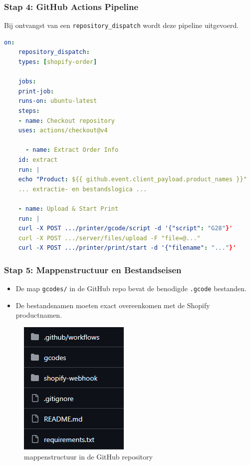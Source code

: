 \begin{enumerate}
\subsubsection{Stap 4: GitHub Actions Pipeline}

Bij ontvangst van een \texttt{repository\_dispatch} wordt deze pipeline uitgevoerd.

\begin{lstlisting}[language=yaml, caption=Shopify Order Print Pipeline (gedeeltelijk)]
    on:
    repository_dispatch:
    types: [shopify-order]
    
    jobs:
    print-job:
    runs-on: ubuntu-latest
    steps:
    - name: Checkout repository
    uses: actions/checkout@v4
    
      - name: Extract Order Info
    id: extract
    run: |
    echo "Product: ${{ github.event.client_payload.product_names }}"
    ... extractie- en bestandslogica ...
    
    - name: Upload & Start Print
    run: |
    curl -X POST .../printer/gcode/script -d '{"script": "G28"}'
    curl -X POST .../server/files/upload -F "file=@..."
    curl -X POST .../printer/print/start -d '{"filename": "..."}'
\end{lstlisting}

\subsubsection{Stap 5: Mappenstructuur en Bestandseisen}

\begin{itemize}
\item De map \texttt{gcodes/} in de GitHub repo bevat de benodigde \texttt{.gcode} bestanden.
\item De bestandsnamen moeten exact overeenkomen met de Shopify productnamen.
\end{itemize}

\begin{figure}[H]
    \centering
    \includegraphics[width=0.3\linewidth]{foto's/Github/Schermafbeelding 2025-04-22 161449.png}
    \caption{mappenstructuur in de GitHub repository}
    \label{fig:Github_Repo}
\end{figure}


\end{enumerate}
